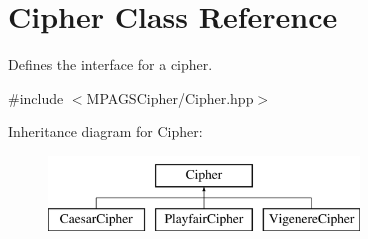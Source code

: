 \hypertarget{class_cipher}{}\section{Cipher Class Reference}
\label{class_cipher}


Defines the interface for a cipher.  




{\ttfamily \#include $<$M\+P\+A\+G\+S\+Cipher/\+Cipher.\+hpp$>$}

Inheritance diagram for Cipher\+:\begin{figure}[H]
\begin{center}
\leavevmode
\includegraphics[height=2.000000cm]{class_cipher}
\end{center}
\end{figure}
